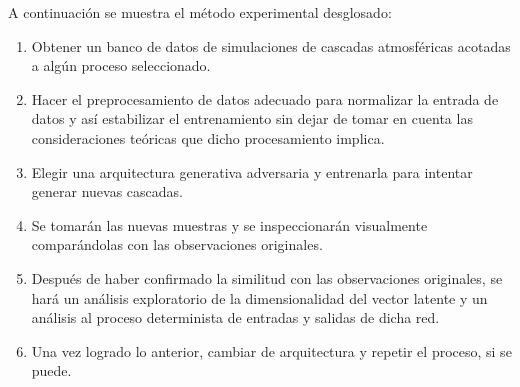 A continuación se muestra el método experimental desglosado:

\begin{enumerate}[label=\alph*)]
    \item Obtener un banco de datos de simulaciones de cascadas atmosféricas acotadas a algún proceso seleccionado.
    \item Hacer el preprocesamiento de datos adecuado para normalizar la entrada de datos y así estabilizar el entrenamiento sin dejar de tomar en cuenta las consideraciones teóricas que dicho procesamiento implica.
    \item Elegir una arquitectura generativa adversaria y entrenarla para intentar generar nuevas cascadas.
    \item Se tomarán las nuevas muestras y se inspeccionarán visualmente comparándolas con las observaciones originales.
    \item Después de haber confirmado la similitud con las observaciones originales, se hará un análisis exploratorio de la dimensionalidad del vector latente y un análisis al proceso determinista de entradas y salidas de dicha red. 
    \item Una vez logrado lo anterior, cambiar de arquitectura y repetir el proceso, si se puede.
\end{enumerate}

